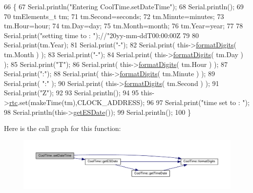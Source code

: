 \begin{DoxyCode}
66 \{ 
67     Serial.println(\textcolor{stringliteral}{"Entering CoolTime.setDateTime"});
68     Serial.println();
69 
70     tmElements\_t tm;
71     tm.Second=seconds; 
72     tm.Minute=minutes; 
73     tm.Hour=hour; 
74     tm.Day=day;
75     tm.Month=month; 
76     tm.Year=year;   
77 
78     Serial.print(\textcolor{stringliteral}{"setting time to : "});\textcolor{comment}{//"20yy-mm-ddT00:00:00Z}
79 
80     Serial.print(tm.Year);
81     Serial.print(\textcolor{stringliteral}{"-"});
82     Serial.print( this->\hyperlink{classCoolTime_acd537cd4210d7bde4e1f5c47d2ac0456}{formatDigits}( tm.Month ) );
83     Serial.print(\textcolor{stringliteral}{"-"});
84     Serial.print( this->\hyperlink{classCoolTime_acd537cd4210d7bde4e1f5c47d2ac0456}{formatDigits}( tm.Day ) );
85     Serial.print(\textcolor{stringliteral}{"T"});
86     Serial.print( this->\hyperlink{classCoolTime_acd537cd4210d7bde4e1f5c47d2ac0456}{formatDigits}( tm.Hour ) );
87     Serial.print(\textcolor{stringliteral}{":"});
88     Serial.print( this->\hyperlink{classCoolTime_acd537cd4210d7bde4e1f5c47d2ac0456}{formatDigits}( tm.Minute ) );
89     Serial.print( \textcolor{stringliteral}{":"} );
90     Serial.print( this->\hyperlink{classCoolTime_acd537cd4210d7bde4e1f5c47d2ac0456}{formatDigits}( tm.Second ) );
91     Serial.print(\textcolor{stringliteral}{"Z"});
92 
93     Serial.println();
94 
95     this->\hyperlink{classCoolTime_abd38f2384ff90692b1568d9db869412e}{rtc}.set(makeTime(tm),CLOCK\_ADDRESS);
96     
97     Serial.print(\textcolor{stringliteral}{"time set to : "});
98     Serial.println(this->\hyperlink{classCoolTime_ac4f32ee513c1328d984306645e8785a4}{getESDate}());
99     Serial.println();
100 \}
\end{DoxyCode}
Here is the call graph for this function\+:
\nopagebreak
\begin{figure}[H]
\begin{center}
\leavevmode
\includegraphics[width=350pt]{classCoolTime_ab81ea7fdaace111aa01cc1ec84c6d297_cgraph}
\end{center}
\end{figure}
\mbox{\label{classCoolTime_aae601f795452cfa48d9fb337aed483a8}} 
